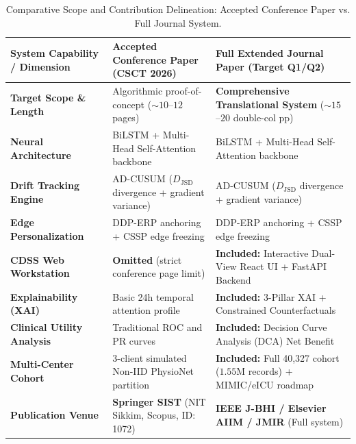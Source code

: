 \documentclass[11pt, a4paper]{article}
\begin{document}
\begin{table}[!htbp]
    \centering
    \scriptsize
    \renewcommand{\arraystretch}{1.10}
    \begin{tabular}{l p{5.0cm} p{5.5cm}}
        \toprule
        \textbf{System Capability / Dimension} & \textbf{Accepted Conference Paper (CSCT 2026)} & \textbf{Full Extended Journal Paper (Target Q1/Q2)} \\
        \midrule
        \textbf{Target Scope \& Length} & Algorithmic proof-of-concept ($\sim 10$--$12$ pages) & \textbf{Comprehensive Translational System} ($\sim 15$--$20$ double-col pp) \\
        \textbf{Neural Architecture} & BiLSTM + Multi-Head Self-Attention backbone & BiLSTM + Multi-Head Self-Attention backbone \\
        \textbf{Drift Tracking Engine} & AD-CUSUM ($D_{\text{JSD}}$ divergence + gradient variance) & AD-CUSUM ($D_{\text{JSD}}$ divergence + gradient variance) \\
        \textbf{Edge Personalization} & DDP-ERP anchoring + CSSP edge freezing & DDP-ERP anchoring + CSSP edge freezing \\
        \textbf{CDSS Web Workstation} & \textbf{Omitted} (strict conference page limit) & \textbf{Included:} Interactive Dual-View React UI + FastAPI Backend \\
        \textbf{Explainability (XAI)} & Basic 24h temporal attention profile & \textbf{Included:} 3-Pillar XAI + Constrained Counterfactuals \\
        \textbf{Clinical Utility Analysis} & Traditional ROC and PR curves & \textbf{Included:} Decision Curve Analysis (DCA) Net Benefit \\
        \textbf{Multi-Center Cohort} & 3-client simulated Non-IID PhysioNet partition & \textbf{Included:} Full 40,327 cohort ($1.55\text{M}$ records) + MIMIC/eICU roadmap \\
        \textbf{Publication Venue} & \textbf{Springer SIST} (NIT Sikkim, Scopus, ID: 1072) & \textbf{IEEE J-BHI / Elsevier AIIM / JMIR} (Full system) \\
        \bottomrule
    \end{tabular}
    \caption{Comparative Scope and Contribution Delineation: Accepted Conference Paper vs. Full Journal System.}
    \label{tab:conf_vs_journal}
\end{table}
\end{document}
